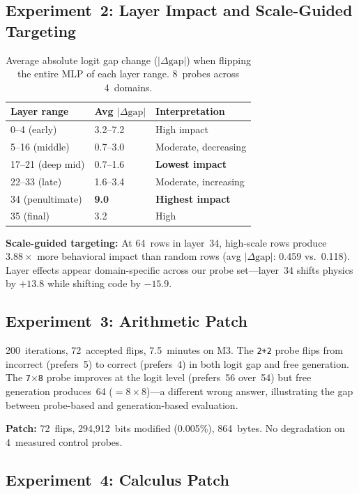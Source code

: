 \documentclass[11pt,a4paper]{article}
\begin{document}
\subsection{Experiment~2: Layer Impact and Scale-Guided Targeting}

\begin{table}[h]
\centering
\caption{Average absolute logit gap change ($|\Delta\text{gap}|$) when
  flipping the entire MLP of each layer range. 8~probes across 4~domains.}
\begin{tabular}{@{}lll@{}}
\toprule
Layer range & Avg $|\Delta\text{gap}|$ & Interpretation \\
\midrule
0--4 (early)        & 3.2--7.2 & High impact \\
5--16 (middle)      & 0.7--3.0 & Moderate, decreasing \\
17--21 (deep mid)   & 0.7--1.6 & \textbf{Lowest impact} \\
22--33 (late)       & 1.6--3.4 & Moderate, increasing \\
34 (penultimate)    & \textbf{9.0} & \textbf{Highest impact} \\
35 (final)          & 3.2 & High \\
\bottomrule
\end{tabular}
\end{table}

\textbf{Scale-guided targeting:} At 64~rows in layer~34, high-scale
rows produce $3.88\times$ more behavioral impact than random rows
(avg $|\Delta\text{gap}|$: 0.459 vs.\ 0.118). Layer effects appear
domain-specific across our probe set---layer~34 shifts physics by
$+13.8$ while shifting code by $-15.9$.

\subsection{Experiment~3: Arithmetic Patch}

200~iterations, 72~accepted flips, 7.5~minutes on M3. The \texttt{2+2}
probe flips from incorrect (prefers~5) to correct (prefers~4) in both
logit gap and free generation. The \texttt{7$\times$8} probe improves
at the logit level (prefers~56 over~54) but free generation produces~64
($=8\times8$)---a different wrong answer, illustrating the gap between
probe-based and generation-based evaluation.

\textbf{Patch:} 72~flips, 294,912~bits modified (0.005\%), 864~bytes.
No degradation on 4~measured control probes.

\subsection{Experiment~4: Calculus Patch}
\end{document}
